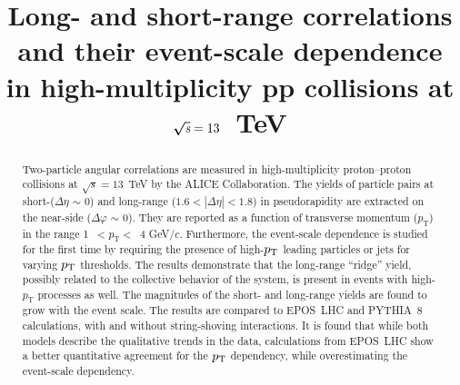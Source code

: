 \documentclass[ALICE,manyauthors]{cernphprep}
\begin{document}
\begin{titlepage}

\PHyear{}
\PHdate{\today}
%

\title{Long- and short-range correlations and their event-scale dependence in high-multiplicity pp collisions at $\boldsymbol{\sqrt{{\textit s}}}=13$~TeV}


\begin{abstract}
%
Two-particle angular correlations are measured in high-multiplicity proton--proton collisions at $\sqrt{s} =13$~TeV by the ALICE Collaboration. The yields of particle pairs at short-($\Delta\eta$ $\sim$ 0) and long-range ($1.6 < |\Delta\eta| < 1.8$) in pseudorapidity are extracted on the near-side ($\Delta\varphi$ $\sim$ 0).
They are reported as a function of transverse momentum ($p_{\mathrm T}$) in the range 1~$<p_{\mathrm T}<$~4 GeV/$c$.
Furthermore, the event-scale dependence is studied for the first time by requiring the presence of high-$p_{\rm T}$ leading particles or jets for varying $p_{\rm T}$ thresholds. 
The results demonstrate that the long-range ``ridge'' yield, possibly related to the collective behavior of the system, is present in events with high-$p_{\mathrm T}$ processes as well. The magnitudes of the short- and long-range yields are found to grow with the event scale. 
The results are compared to EPOS~LHC and PYTHIA~8 calculations, with and without string-shoving interactions. It is found that while both models describe the qualitative trends in the data, calculations from EPOS~LHC show a better quantitative agreement for the $p_{\rm T}$ dependency, while overestimating the event-scale dependency.


\end{abstract}
\end{titlepage}
\end{document}

